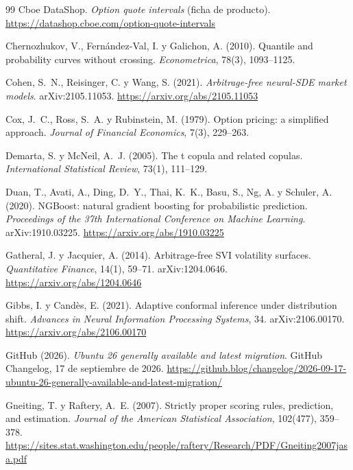 \begin{thebibliography}{99}
Cboe DataShop. \emph{Option quote intervals} (ficha de producto). \url{https://datashop.cboe.com/option-quote-intervals}

Chernozhukov, V., Fernández-Val, I. y Galichon, A. (2010). Quantile and probability curves without
crossing. \emph{Econometrica}, 78(3), 1093--1125.

Cohen, S.~N., Reisinger, C. y Wang, S. (2021). \emph{Arbitrage-free neural-SDE market models}.
arXiv:2105.11053. \url{https://arxiv.org/abs/2105.11053}

Cox, J.~C., Ross, S.~A. y Rubinstein, M. (1979). Option pricing: a simplified approach. \emph{Journal of
Financial Economics}, 7(3), 229--263.

Demarta, S. y McNeil, A.~J. (2005). The t copula and related copulas. \emph{International Statistical
Review}, 73(1), 111--129.

Duan, T., Avati, A., Ding, D.~Y., Thai, K.~K., Basu, S., Ng, A. y Schuler, A. (2020). NGBoost: natural
gradient boosting for probabilistic prediction. \emph{Proceedings of the 37th International Conference on
Machine Learning}. arXiv:1910.03225. \url{https://arxiv.org/abs/1910.03225}

Gatheral, J. y Jacquier, A. (2014). Arbitrage-free SVI volatility surfaces. \emph{Quantitative Finance},
14(1), 59--71. arXiv:1204.0646. \url{https://arxiv.org/abs/1204.0646}

Gibbs, I. y Candès, E. (2021). Adaptive conformal inference under distribution shift. \emph{Advances in
Neural Information Processing Systems}, 34. arXiv:2106.00170. \url{https://arxiv.org/abs/2106.00170}

GitHub (2026). \emph{Ubuntu 26 generally available and latest migration}. GitHub Changelog, 17 de
septiembre de 2026.
\url{https://github.blog/changelog/2026-09-17-ubuntu-26-generally-available-and-latest-migration/}

Gneiting, T. y Raftery, A.~E. (2007). Strictly proper scoring rules, prediction, and estimation.
\emph{Journal of the American Statistical Association}, 102(477), 359--378.
\url{https://sites.stat.washington.edu/people/raftery/Research/PDF/Gneiting2007jasa.pdf}


\end{thebibliography}
